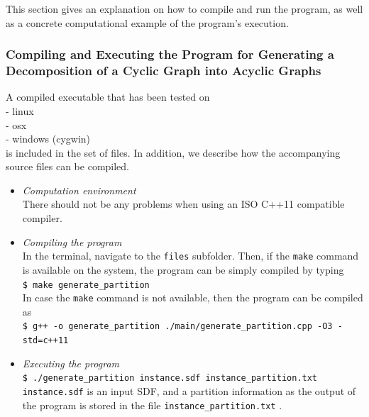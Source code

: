 \documentclass[11pt,titlepage,dvipdfmx,twoside]{book}
\begin{document}
This section gives an explanation on how to compile and run the program,
as well as a concrete computational example of the program's execution.


\subsubsection{
Compiling and Executing the Program for Generating
a Decomposition of a Cyclic Graph  into Acyclic Graphs
}
\label{sec:compile_p}

A compiled executable that has been tested on\\
- linux \\
- osx \\
- windows (cygwin) \\
is included in the set of files.
In addition, we describe how the accompanying source files can be compiled.

\begin{itemize}
	\item {\em Computation environment}\\
		There should not be any problems when using an ISO C++11 compatible compiler. %
	\item {\em Compiling the program}\\
	      In the terminal, navigate to the {\tt files} subfolder.
	      Then, if the {\tt make} command is available on the system, the program can be simply compiled by typing \\
	      \verb|$ make generate_partition|\\
	      In case the {\tt make} command is not available, then the program can be compiled as \\	      
		\verb|$ g++ -o generate_partition ./main/generate_partition.cpp -O3 -std=c++11|\\
	\item {\em Executing the program}\\
		\verb|$ ./generate_partition instance.sdf instance_partition.txt|\\
		\verb|instance.sdf|  is an input SDF, 
		and a partition information as the output of the program is stored in the file
	  \verb|instance_partition.txt| .
\end{itemize}
\end{document}

